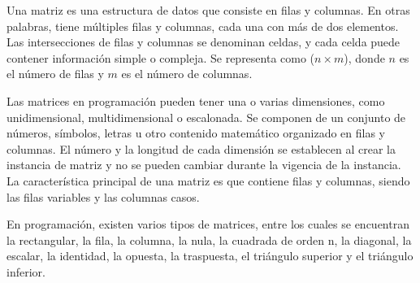Una matriz es una estructura de datos que consiste en filas y columnas. En otras palabras, tiene múltiples filas y columnas, cada una con más de dos elementos. Las intersecciones de filas y columnas se denominan celdas, y cada celda puede contener información simple o compleja. Se representa como ($n \times m$), donde $n$ es el número de filas y $m$ es el número de columnas. 

Las matrices en programación pueden tener una o varias dimensiones, como unidimensional, multidimensional o escalonada. Se componen de un conjunto de números, símbolos, letras u otro contenido matemático organizado en filas y columnas. El número y la longitud de cada dimensión se establecen al crear la instancia de matriz y no se pueden cambiar durante la vigencia de la instancia. La característica principal de una matriz es que contiene filas y columnas, siendo las filas variables y las columnas casos.

En programación, existen varios tipos de matrices, entre los cuales se encuentran la rectangular, la fila, la columna, la nula, la cuadrada de orden n, la diagonal, la escalar, la identidad, la opuesta, la traspuesta, el triángulo superior y el triángulo inferior.